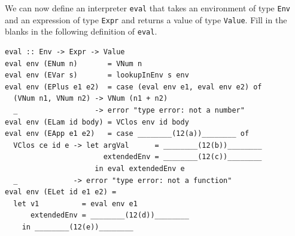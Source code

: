 \documentclass[addpoints]{exam}
\begin{document}
\begin{questions}
\begin{parts}
\end{parts}

\question We can now define an interpreter \verb|eval| that takes an environment of type \verb|Env| and an expression of type \verb|Expr| and returns a value of type \verb|Value|.  Fill in the blanks in the following definition of \verb|eval|.

\newpage

\begin{verbatim}
eval :: Env -> Expr -> Value
eval env (ENum n)       = VNum n
eval env (EVar s)       = lookupInEnv s env
eval env (EPlus e1 e2)  = case (eval env e1, eval env e2) of
  (VNum n1, VNum n2) -> VNum (n1 + n2)
  _                  -> error "type error: not a number"
eval env (ELam id body) = VClos env id body
eval env (EApp e1 e2)   = case ________(12(a))________ of
  VClos ce id e -> let argVal      = ________(12(b))________
                       extendedEnv = ________(12(c))________
                     in eval extendedEnv e
  _             -> error "type error: not a function"                      
eval env (ELet id e1 e2) =
  let v1          = eval env e1
      extendedEnv = ________(12(d))________
    in ________(12(e))________
\end{verbatim}

\end{questions}
\end{document}
